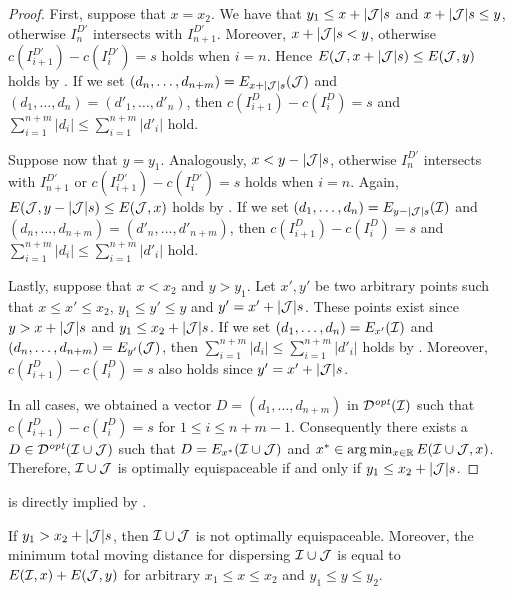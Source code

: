 \begin{proof}
    First, suppose that $x = x_2$.
    We have that $y_1 \le x+|\mathcal{J}|s$ and $x+|\mathcal{J}|s \le y$, otherwise $I^{D'}_n$ intersects with $I^{D'}_{n+1}$.
    Moreover, $x+|\mathcal{J}|s < y$, otherwise $c(I^{D'}_{i+1}) - c(I^{D'}_{i}) = s$ holds when $i=n$.
    Hence $E(\mathcal{J},x+|\mathcal{J}|s) \le E(\mathcal{J},y)$ holds by .
    If we set $(d_n,\ldots,d_{n+m}) = E_{x+|\mathcal{J}|s}(\mathcal{J})$ and $(d_1,\ldots,d_n) = (d'_1,\ldots,d'_n)$, then $c(I^D_{i+1}) - c(I^D_{i}) = s$ and $\sum_{i=1}^{n+m} |d_i| \le \sum_{i=1}^{n+m} |d'_i|$ hold.

    Suppose now that $y = y_1$.
    Analogously, $x< y - |\mathcal{J}|s$, otherwise $I^{D'}_n$ intersects with $I^{D'}_{n+1}$ or $c(I^{D'}_{i+1}) - c(I^{D'}_{i}) = s$ holds when $i=n$.
    Again, $E(\mathcal{J},y-|\mathcal{J}|s) \le E(\mathcal{J},x)$ holds by .
    If we set $(d_1,\ldots,d_n) = E_{y-|\mathcal{J}|s}(\mathcal{I})$  and $(d_n,\ldots,d_{n+m}) = (d'_n,\ldots,d'_{n+m})$, then $c(I^D_{i+1}) - c(I^D_{i}) = s$ and $\sum_{i=1}^{n+m} |d_i| \le \sum_{i=1}^{n+m} |d'_i|$ hold.

    Lastly, suppose that $x<x_2$ and $y>y_1$.
    Let $x',y'$ be two arbitrary points such that $x\le x' \le x_2$, $y_1 \le y' \le y$ and $y' = x'+|\mathcal{J}|s$.
    These points exist since $y > x+|\mathcal{J}|s$ and $y_1 \le x_2+|\mathcal{J}|s$.
    If we set $(d_1,\ldots,d_n) = E_{x'}(\mathcal{I})$ and $(d_n,\ldots,d_{n+m}) = E_{y'}(\mathcal{J})$, then $\sum_{i=1}^{n+m} |d_i| \le \sum_{i=1}^{n+m} |d'_i|$ holds by .
    Moreover, $c(I^D_{i+1}) - c(I^D_{i}) = s$ also holds since $y' = x' +|\mathcal{J}|s$. %
    
    In all cases, we obtained a vector $D = (d_1,\ldots,d_{n+m})$ in $\mathcal{D}^{\mathit{opt}}(\mathcal{I})$ such that $c(I^D_{i+1}) - c(I^D_{i}) = s$ for $1\le i\le n+m-1$.
    Consequently there exists a $D \in \mathcal{D}^{\mathit{opt}}(\mathcal{I}\cup \mathcal{J})$ such that $D = E_{x^*}(\mathcal{I}\cup \mathcal{J})$ and $x^* \in \argmin_{x \in \mathbb{R}} E(\I\cup\J,x)$.
    Therefore, $\mathcal{I} \cup \mathcal{J}$ is optimally equispaceable if and only if $y_1 \le x_2 + |\mathcal{J}|s$.
\end{proof}

 is directly implied by .

\begin{corollary}\label{cor:tmd_opt_no_intersect}
    If $y_1 > x_2 + |\mathcal{J}| s$, then $\mathcal{I} \cup \mathcal{J}$ is not optimally equispaceable.
    Moreover, the minimum total moving distance for dispersing $\mathcal{I} \cup \mathcal{J}$ is equal to $E(\mathcal{I},x) + E(\mathcal{J},y)$ for arbitrary $x_1\le x\le x_2$ and $y_1\le y\le y_2$.
\end{corollary}

